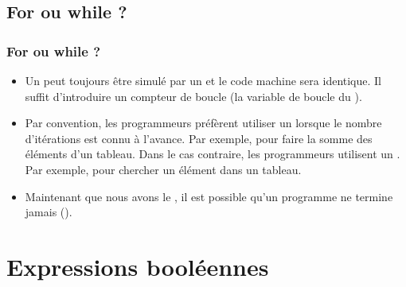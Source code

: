 \documentclass[xcolor=pdftex,svgnames,table]{beamer}
\begin{document}
\subsection{For ou while ?}
\begin{frame}
  \frametitle{For ou while ?}

  \begin{itemize}
  \item Un  peut toujours être simulé par un  et le
    code machine sera identique. Il suffit d'introduire un
    \alert{compteur de boucle} (la variable de boucle du
    ).\pause
\item Par convention, les programmeurs préfèrent utiliser un  lorsque
  le nombre d'itérations est connu à l'avance. Par exemple, pour
  faire la somme des éléments d'un tableau. Dans le cas contraire, les
  programmeurs utilisent un . Par exemple, pour chercher un
  élément dans un tableau.\pause
\item Maintenant que nous avons le , il est possible qu'un
  programme ne termine jamais ().
  \end{itemize}
\end{frame}

\section{Expressions booléennes}
\end{document}

